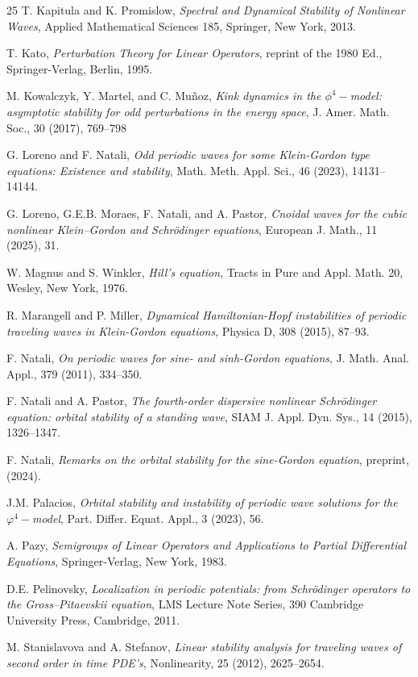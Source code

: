 \documentclass[12pt,reqno,a4paper]{amsart} %
\numberwithin{equation}{section}
\numberwithin{figure}{section}
\begin{document}
\begin{thebibliography}{25}
 T. Kapitula and K. Promislow, \textit{Spectral and Dynamical Stability of Nonlinear Waves},  Applied Mathematical Sciences 185, Springer, New York, 2013.

 T. Kato, \textit{Perturbation Theory for Linear Operators}, reprint of the 1980 Ed., Springer-Verlag, Berlin, 1995.

 M. Kowalczyk, Y. Martel, and C. Mu\~noz, \textit{Kink dynamics in the $\phi^4-$model: asymptotic stability for odd perturbations in the energy space}, J. Amer. Math. Soc., 30 (2017), 769–798

 G. Loreno and F.  Natali, \textit{Odd periodic waves for some Klein-Gordon type equations: Existence and stability}, Math. Meth. Appl. Sci., 46 (2023), 14131--14144.

 G. Loreno, G.E.B. Moraes, F. Natali, and A. Pastor, \textit{Cnoidal waves for the cubic nonlinear Klein–Gordon and Schrödinger equations}, European J. Math., 11 (2025), 31.

  W. Magnus and S. Winkler,  \textit{Hill's equation},
Tracts in Pure and Appl. Math. 20, Wesley, New York, 1976.

  R. Marangell and P. Miller, \textit{Dynamical Hamiltonian-Hopf instabilities of periodic traveling waves in Klein-Gordon equations}, Physica D, 308 (2015), 87--93.

 F. Natali, \textit{On periodic waves for sine- and sinh-Gordon equations}, J. Math. Anal. Appl., 379 (2011), 334--350. 

 F. Natali and A. Pastor, \textit{The fourth-order dispersive nonlinear Schr\"odinger equation: orbital stability of a standing wave}, SIAM J. Appl. Dyn. Sys., 14 (2015),  1326--1347.

 F. Natali, \textit{Remarks on the orbital stability for the sine-Gordon equation}, preprint, (2024).

 J.M. Palacios, \textit{Orbital stability and instability of periodic wave solutions for the $\varphi^4-$model}, Part. Differ. Equat. Appl., 3 (2023), 56.

 A. Pazy, \textit{Semigroups of Linear Operators and Applications to Partial Differential Equations}, Springer-Verlag, New York,  1983.

 D.E. Pelinovsky, \textit{Localization in periodic potentials: from Schr\"{o}dinger operators
	to the Gross--Pitaevskii equation}, LMS Lecture Note Series,  390 Cambridge University Press, Cambridge, 2011.

 M. Stanislavova and A. Stefanov, \textit{Linear stability analysis for traveling waves of second order in time PDE's}, Nonlinearity, 25 (2012), 2625--2654.
\end{thebibliography}
\end{document}
